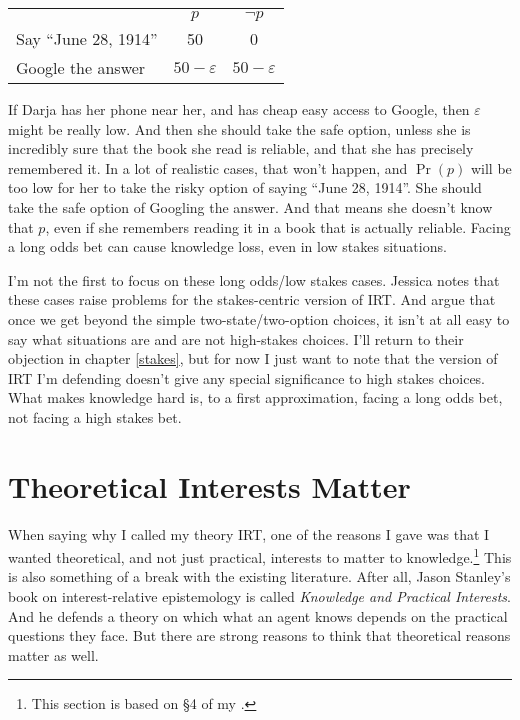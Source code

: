 \documentclass[11pt,]{book}
\let\rmarkdownfootnote\footnote%
\def\footnote{\protect\rmarkdownfootnote}
\def\toprule{}
\def\bottomrule{}
\begin{document}
\begin{longtable}[]{@{}lcc@{}}
\toprule
\endhead
& \(p\) & \(\neg p\)\tabularnewline
Say ``June 28, 1914'' & 50 & 0\tabularnewline
Google the answer & \(50 - \varepsilon\) & \(50 - \varepsilon\)\tabularnewline
\bottomrule
\end{longtable}

If Darja has her phone near her, and has cheap easy access to Google, then \(\varepsilon\) might be really low. And then she should take the safe option, unless she is incredibly sure that the book she read is reliable, and that she has precisely remembered it. In a lot of realistic cases, that won't happen, and \(\Pr(p)\) will be too low for her to take the risky option of saying ``June 28, 1914''. She should take the safe option of Googling the answer. And that means she doesn't know that \(p\), even if she remembers reading it in a book that is actually reliable. Facing a long odds bet can cause knowledge loss, even in low stakes situations.

I'm not the first to focus on these long odds/low stakes cases. Jessica \citet[176]{Brown2008} notes that these cases raise problems for the stakes-centric version of IRT. And \citet{AndersonHawthorne2019a} argue that once we get beyond the simple two-state/two-option choices, it isn't at all easy to say what situations are and are not high-stakes choices. I'll return to their objection in chapter \ref{stakes}, but for now I just want to note that the version of IRT I'm defending doesn't give any special significance to high stakes choices. What makes knowledge hard is, to a first approximation, facing a long odds bet, not facing a high stakes bet.

\hypertarget{whatinterests}{%
\section{Theoretical Interests Matter}\label{whatinterests}}

When saying why I called my theory IRT, one of the reasons I gave was that I wanted theoretical, and not just practical, interests to matter to knowledge.\footnote{This section is based on §4 of my \citeyearpar{Weatherson2017-WEAII}.} This is also something of a break with the existing literature. After all, Jason Stanley's book on interest-relative epistemology is called \emph{Knowledge and Practical Interests}. And he defends a theory on which what an agent knows depends on the practical questions they face. But there are strong reasons to think that theoretical reasons matter as well.
\end{document}
